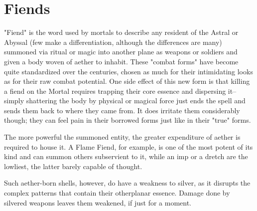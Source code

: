 \FloatBarrier
\section{Fiends}
"Fiend" is the word used by mortals to describe any resident of the Astral or Abyssal (few make a differentiation, although the differences are many) summoned via ritual or magic into another plane as weapons or soldiers and given a body woven of aether to inhabit. These "combat forms" have become quite standardized over the centuries, chosen as much for their intimidating looks as for their raw combat potential. One side effect of this new form is that killing a fiend on the Mortal requires trapping their core essence and dispersing it--simply shattering the body by physical or magical force just ends the spell and sends them back to where they came from. It does irritate them considerably though; they can feel pain in their borrowed forms just like in their "true" forms.

The more powerful the summoned entity, the greater expenditure of aether is required to house it. A Flame Fiend, for example, is one of the most potent of its kind and can summon others subservient to it, while an imp or a dretch are the lowliest, the latter barely capable of thought.

Such aether-born shells, however, do have a weakness to silver, as it disrupts the complex patterns that contain their otherplanar essence. Damage done by silvered weapons leaves them weakened, if just for a moment.

